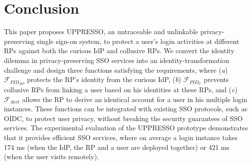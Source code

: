 \section{Conclusion}
\label{sec:conclusion}
This paper proposes UPPRESSO, an untraceable and unlinkable privacy-preserving single sign-on system,
 to protect a user's login activities at different RPs against both the curious IdP and collusive RPs.
We convert the identity dilemma in privacy-preserving SSO services into an identity-transformation challenge
 and design three functions satisfying the requirements,
 where (\emph{a}) $\mathcal{F}_{PID_{RP}}$ protects the RP's identity from the curious IdP,
(\emph{b})  $\mathcal{F}_{PID_{U}}$ prevents collusive RPs from linking a user based on his identities at these RPs,
 and (\emph{c}) $\mathcal{F}_{Acct}$ allows the RP to derive an identical account for a user in his multiple login instances.
These functions can be integrated with existing SSO protocols,
    such as OIDC,
    to protect user privacy,
    without breaking the security guarantees of SSO services.
The experimental evaluation of the UPPRESSO prototype demonstrates
 that it provides efficient SSO services,
  where on average a login instance takes 174 ms (when the IdP, the RP and a user are deployed together) or 421 ms (when the user visits remotely).

